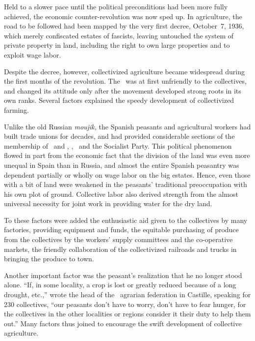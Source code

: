 Held to a slower pace until the political preconditions had been more fully achieved, the economic counter-revolution was now sped up. In agriculture, the road to be followed had been mapped by the very first decree, October~7, 1936, which merely confiscated estates of fascists, leaving untouched the system of private property in land, including the right to own large properties and to exploit wage labor.

\begin{sloppypar}
Despite the decree, however, collectivized agriculture became wide\-spread during the first months of the revolution. The \UGT\ was at first unfriendly to the collectives, and changed its attitude only after the movement developed strong roots in its own ranks. Several factors explained the speedy development of collectivized farming.
\end{sloppypar}

Unlike the old Russian \emph{moujik,} the Spanish peasants and agricultural workers had built trade unions for decades, and had provided considerable sections of the membership of \CNT\ and \FAI, \UGT, \POUM\ and the Socialist Party. This political phenomenon flowed in part from the economic fact that the division of the land was even more unequal in Spain than in Russia, and almost the entire Spanish peasantry was dependent partially or wholly on wage labor on the big estates. Hence, even those with a bit of land were weakened in the peasants’ traditional preoccupation with his own plot of ground. Collective labor also derived strength from the almost universal necessity for joint work in providing water for the dry land.
\nowidow

To these factors were added the enthusiastic aid given to the collectives by many factories, providing equipment and funds, the equitable purchasing of produce from the collectives by the workers’ supply committees and the co-operative markets, the friendly collaboration of the collectivized railroads and trucks in bringing the produce to town.

Another important factor was the peasant’s realization that he no longer stood alone. ``If, in some locality, a crop is lost or greatly reduced because of a long drought, etc.,''
wrote the head of the \CNT\ agrarian federation in Castille, speaking for 230 collectives, ``our peasants don’t have to worry, don’t have to fear hunger, for the collectives in the other localities or regions consider it their duty to help them out.'' Many factors thus joined to encourage the swift development of collective agriculture.

